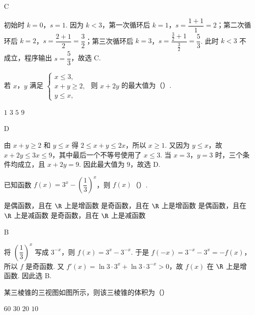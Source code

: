 \begin{answer}
C
\end{answer}

\begin{solution}
初始时 \(k=0\)，\(s=1\). 因为 \(k<3\)，第一次循环后 \(k=1\)，\(s=\dfrac{1+1}{1}=2\)；第二次循环后 \(k=2\)，\(s=\dfrac{2+1}{2}=\dfrac32\)；第三次循环后 \(k=3\)，\(s=\dfrac{\frac32+1}{\frac32}=\dfrac53\).
此时 \(k<3\) 不成立，程序输出 \(s=\dfrac53\)，故选 C.
\end{solution}

\begin{problem}
若 \(x\)，\(y\) 满足 \(\begin{cases}
x\le3,\\
x+y\ge2,\\
y\le x,
\end{cases}\) 则 \(x+2y\) 的最大值为（\quad）.

\choices
    {\(1\)}
    {\(3\)}
    {\(5\)}
    {\(9\)}
\end{problem}

\begin{answer}
D
\end{answer}

\begin{solution}
由 \(x+y\ge2\) 和 \(y\le x\) 得 \(2\le x+y\le2x\)，所以 \(x\ge1\). 又因为 \(y\le x\)，故 \(x+2y\le3x\le9\)，其中最后一个不等号使用了 \(x\le3\).
当 \(x=3\)，\(y=3\) 时，三个条件均成立，且 \(x+2y=9\). 因此最大值为 \(9\)，故选 D.
\end{solution}

\begin{problem}
已知函数 \(f(x)=3^x-\left(\dfrac13\right)^x\)，则 \(f(x)\)（\quad）.

\choices
    {是偶函数，且在 \(\R\) 上是增函数}
    {是奇函数，且在 \(\R\) 上是增函数}
    {是偶函数，且在 \(\R\) 上是减函数}
    {是奇函数，且在 \(\R\) 上是减函数}
\end{problem}

\begin{answer}
B
\end{answer}

\begin{solution}
将 \(\left(\dfrac13\right)^x\) 写成 \(3^{-x}\)，则 \(f(x)=3^x-3^{-x}\). 于是 \(f(-x)=3^{-x}-3^x=-f(x)\)，所以 \(f\) 是奇函数.
又 \(f'(x)=\ln3\cdot3^x+\ln3\cdot3^{-x}>0\)，故 \(f(x)\) 在 \(\R\) 上是增函数. 因此选 B.
\end{solution}

\begin{problem}
某三棱锥的三视图如图所示，则该三棱锥的体积为（\quad）


\choices
    {\(60\)}
    {\(30\)}
    {\(20\)}
    {\(10\)}
\end{problem}

